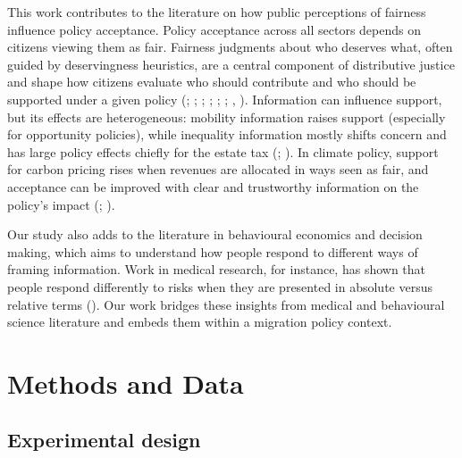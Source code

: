 \documentclass[
  12pt,
  a4paper,
]{article}
\begin{document}
This work contributes to the literature on how public perceptions of fairness influence policy acceptance. Policy acceptance across all sectors depends on citizens viewing them as fair. Fairness judgments about who deserves what, often guided by deservingness heuristics, are a central component of distributive justice and shape how citizens evaluate who should contribute and who should be supported under a given policy (; ; ; ; ; ; , ). Information can influence support, but its effects are heterogeneous: mobility information raises support (especially for opportunity policies), while inequality information mostly shifts concern and has large policy effects chiefly for the estate tax (; ). In climate policy, support for carbon pricing rises when revenues are allocated in ways seen as fair, and acceptance can be improved with clear and trustworthy information on the policy's impact (; ).

Our study also adds to the literature in behavioural economics and decision making, which aims to understand how people respond to different ways of framing information. Work in medical research, for instance, has shown that people respond differently to risks when they are presented in absolute versus relative terms (). Our work bridges these insights from medical and behavioural science literature and embeds them within a migration policy context.

\section{Methods and Data}\label{methods-and-data}

\subsection{Experimental design}\label{experimental-design}
\end{document}

